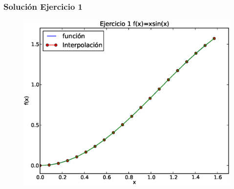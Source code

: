 \begin{frame}
\frametitle{Solución Ejercicio 1}
\begin{figure}
	\centering
	\includegraphics[scale=0.45]{Imagenes/ejercicioTema21_1.eps} 
\end{figure}
\end{frame}

